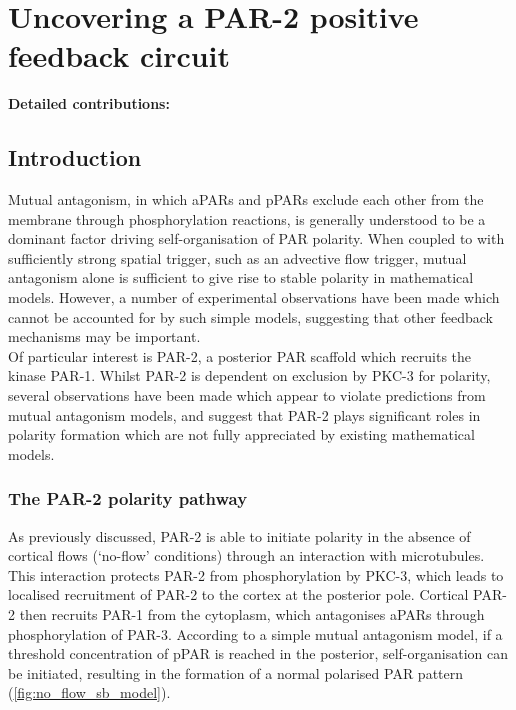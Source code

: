 \documentclass[12pt]{"report"}
\begin{document}
\clearpage
\chapter{Uncovering a PAR-2 positive feedback circuit}

\textbf{Detailed contributions:}\\

\clearpage
\section{Introduction}


Mutual antagonism, in which aPARs and pPARs exclude each other from the membrane through phosphorylation reactions, is generally understood to be a dominant factor driving self-organisation of PAR polarity. When coupled to with sufficiently strong spatial trigger, such as an advective flow trigger, mutual antagonism alone is sufficient to give rise to stable polarity in mathematical models. However, a number of experimental observations have been made which cannot be accounted for by such simple models, suggesting that other feedback mechanisms may be important.\\

Of particular interest is PAR-2, a posterior PAR scaffold which recruits the kinase PAR-1. Whilst PAR-2 is dependent on exclusion by PKC-3 for polarity, several observations have been made which appear to violate predictions from mutual antagonism models, and suggest that PAR-2 plays significant roles in polarity formation which are not fully appreciated by existing mathematical models.\\

\subsection{The PAR-2 polarity pathway}

As previously discussed, PAR-2 is able to initiate polarity in the absence of cortical flows (`no-flow' conditions) through an interaction with microtubules. This interaction protects PAR-2 from phosphorylation by PKC-3, which leads to localised recruitment of PAR-2 to the cortex at the posterior pole. Cortical PAR-2 then recruits PAR-1 from the cytoplasm, which antagonises aPARs through phosphorylation of PAR-3. According to a simple mutual antagonism model, if a threshold concentration of pPAR is reached in the posterior, self-organisation can be initiated, resulting in the formation of a normal polarised PAR pattern (\cref{fig:no_flow_sb_model}). \\
\end{document}
